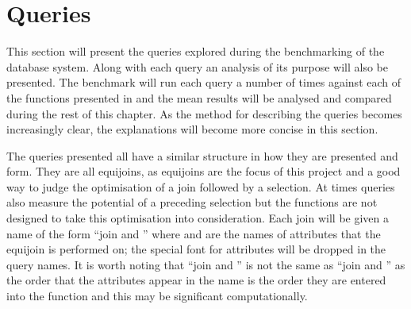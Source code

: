 \section{Queries}
This section will present the queries explored during the benchmarking of the
database system. Along with each query an analysis of its purpose will also be
presented. The benchmark will run each query a number of times against each of
the functions presented in  and the mean results
will be analysed and compared during the rest of this chapter. As the method for
describing the queries becomes increasingly clear, the explanations will become
more concise in this section.

The queries presented all have a similar structure in how they are presented and
form. They are all equijoins, as equijoins are the focus of this project and a
good way to judge the optimisation of a join followed by a selection. At times
queries also measure the potential of a preceding selection but the functions
are not designed to take this optimisation into consideration. Each join
will be given a name of the form ``join  and
'' where  and 
are the names of attributes that the equijoin is performed on; the special font
for attributes will be dropped in the query names. It is worth noting that
``join  and '' is not the same as
``join  and '' as the order that the
attributes appear in the name is the order they are entered into the function
and this may be significant computationally.

